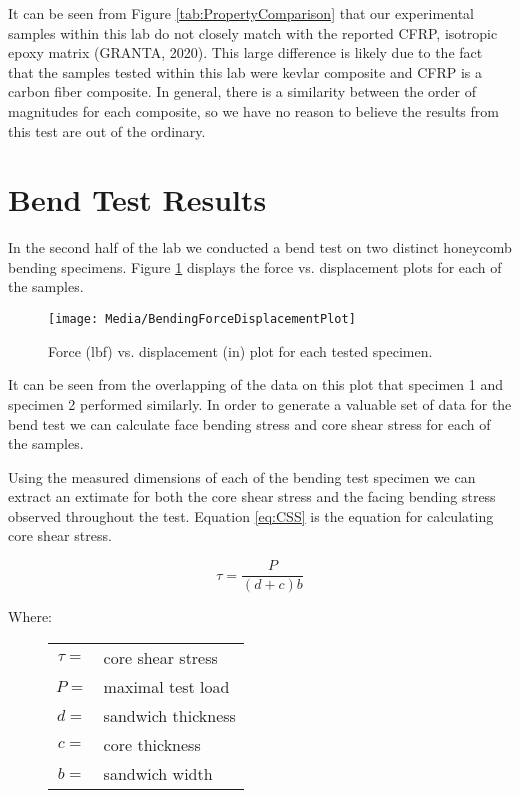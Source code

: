\documentclass{article}
\begin{document}
It can be seen from Figure \ref{tab:PropertyComparison} that our experimental samples within this lab do not closely match with the reported CFRP, isotropic epoxy matrix (GRANTA, 2020). This large difference is likely due to the fact that the samples tested within this lab were kevlar composite and CFRP is a carbon fiber composite. In general, there is a similarity between the order of magnitudes for each composite, so we have no reason to believe the results from this test are out of the ordinary.

\section{Bend Test Results}
In the second half of the lab we conducted a bend test on two distinct honeycomb bending specimens. Figure \ref{fig:BendingForceDisplacement} displays the force vs. displacement plots for each of the samples.

\begin{figure}[H]
  \begin{center}
    \texttt{[image: Media/BendingForceDisplacementPlot]}
    \caption{Force (lbf) vs. displacement (in) plot for each tested specimen.}
    \label{fig:BendingForceDisplacement}
  \end{center}
\end{figure}

It can be seen from the overlapping of the data on this plot that specimen 1 and specimen 2 performed similarly. In order to generate a valuable set of data for the bend test we can calculate face bending stress and core shear stress for each of the samples.

Using the measured dimensions of each of the bending test specimen we can extract an extimate for both the core shear stress and the facing bending stress observed throughout the test. Equation \ref{eq:CSS} is the equation for calculating core shear stress.

\begin{equation}
  \tau = \frac{P}{(d+c)b}
  \label{eq:CSS}
\end{equation}

Where:
\begin{figure}[H]
  \begin{center}
    \begin{tabular}{cl}
      $\tau=$ & core shear stress \\
      $P=$ & maximal test load \\
      $d=$ & sandwich thickness \\
      $c=$ & core thickness \\
      $b=$ & sandwich width \\
    \end{tabular}
  \end{center}
\end{figure}
\end{document}
